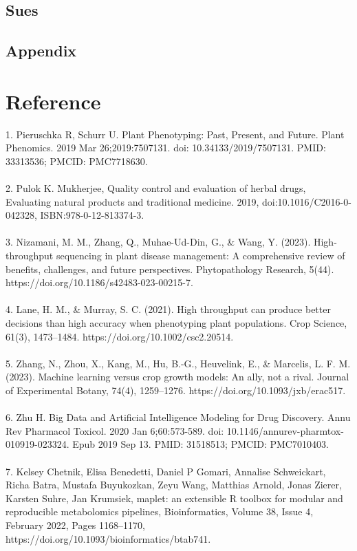 \documentclass[12pt,a4paper]{report}
\begin{document}
\section{Sues}

\section{Appendix}


\chapter{Reference}

    
1. Pieruschka R, Schurr U. Plant Phenotyping: Past, Present, and Future. Plant Phenomics. 2019 Mar   26;2019:7507131. doi: 10.34133/2019/7507131. PMID: 33313536; PMCID: PMC7718630. \\
\\
2. Pulok K. Mukherjee, Quality control and evaluation of herbal drugs, Evaluating natural products and traditional medicine. 2019, doi:10.1016/C2016-0-042328, ISBN:978-0-12-813374-3. \\
\\
3. Nizamani, M. M., Zhang, Q., Muhae-Ud-Din, G., \& Wang, Y. (2023). High-throughput sequencing in plant disease management: A comprehensive review of benefits, challenges, and future perspectives. Phytopathology Research, 5(44). https://doi.org/10.1186/s42483-023-00215-7. \\
\\
4. Lane, H. M., \& Murray, S. C. (2021). High throughput can produce better decisions than high accuracy when phenotyping plant populations. Crop Science, 61(3), 1473–1484. https://doi.org/10.1002/csc2.20514. \\
\\
5. Zhang, N., Zhou, X., Kang, M., Hu, B.-G., Heuvelink, E., \& Marcelis, L. F. M. (2023). Machine learning versus crop growth models: An ally, not a rival. Journal of Experimental Botany, 74(4), 1259–1276. https://doi.org/10.1093/jxb/erac517. \\
\\
6. Zhu H. Big Data and Artificial Intelligence Modeling for Drug Discovery. Annu Rev Pharmacol Toxicol. 2020 Jan 6;60:573-589. doi: 10.1146/annurev-pharmtox-010919-023324. Epub 2019 Sep 13. PMID: 31518513; PMCID: PMC7010403. \\
\\
7. Kelsey Chetnik, Elisa Benedetti, Daniel P Gomari, Annalise Schweickart, Richa Batra, Mustafa Buyukozkan, Zeyu Wang, Matthias Arnold, Jonas Zierer, Karsten Suhre, Jan Krumsiek,  maplet: an extensible R toolbox for modular and reproducible metabolomics pipelines, Bioinformatics, Volume 38, Issue 4, February 2022, Pages 1168–1170, https://doi.org/10.1093/bioinformatics/btab741. \\
\end{document}
